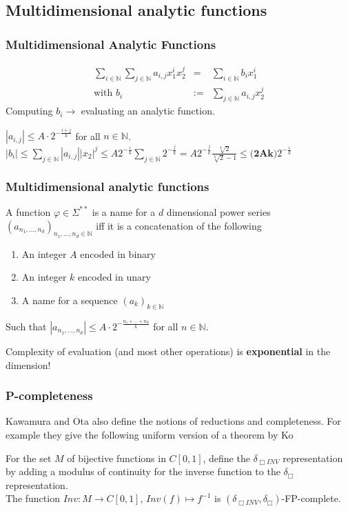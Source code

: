 \documentclass[xcolor=pdftex,dvipsnames,table]{beamer}
\newcommand{\N}{\ensuremath{\mathbb{N}}}
\newcommand{\sigmas}{\ensuremath{\Sigma^{**}}}
\newcommand{\abs}[1]{\left|#1\right|}
\begin{document}
\subsection{Multidimensional analytic functions}
\begin{frame}
  \frametitle{Multidimensional Analytic Functions}
  \begin{tcolorbox}[colback=yellow!5,title=Multidimensional Power Series,colframe=green!75!black]
    \begin{eqnarray*}
      \sum_{i \in \N} \sum_{j \in \N} a_{i,j} x_1^{i} x_2^{j} & = & \sum_{i \in \N} b_i x_1^{i} \\
      \text{with }
      b_i &:=& \sum_{j \in \N} a_{i,j}x_2^j
    \end{eqnarray*}
    Computing $b_i \rightarrow $ evaluating an analytic function.
\end{tcolorbox}
  \pause
  $\abs{a_{i,j}} \leq A \cdot 2^{-\frac{i+j}{k}}$ for all $n \in \N$. \\
  $\abs{b_i} \leq \sum_{j \in \N} \abs{a_{i,j}}\abs{x_2}^j \leq A2^{-\frac{i}{k}} \sum_{j \in \N} 2^{-\frac{j}{k}} = A2^{-\frac{j}{k}}\frac{\sqrt[k]{2}}{\sqrt[k]{2}-1} \leq \textbf{(2Ak)}2^{-\frac{i}{k}}   $
  \end{frame}
\begin{frame}
  \frametitle{Multidimensional analytic functions}
   \begin{tcolorbox}[colback=yellow!5,title=Representation,colframe=blue!75!black]
  A function $\varphi \in \sigmas$ is a name for a $d$ dimensional power series $(a_{n_1,\dots,n_d})_{n_1,\dots,n_d \in \N}$ iff it is a concatenation of the following
  \begin{enumerate}
  \item An integer $A$ encoded in binary
  \item An integer $k$ encoded in unary
  \item A name for a sequence $(a_k)_{k \in \N}$
  \end{enumerate}
  Such that $\abs{a_{n_1,\dots,n_d}} \leq A \cdot 2^{-\frac{n_1+\dots+n_d}{k}}$ for all $n \in \N$.
\end{tcolorbox}
   \pause
  \begin{tcolorbox}[colback=yellow!5,title=Note,colframe=red!75!black]
    Complexity of evaluation (and most other operations) is \textbf{exponential} in the dimension!
  \end{tcolorbox}
  \end{frame}
\begin{frame}
  \frametitle{P-completeness}
  Kawamura and Ota also define the notions of reductions and completeness.
  For example they give the following uniform version of a theorem by Ko
  \begin{theorem}
    For the set $M$ of bijective functions in $C[0,1]$, define the $\delta_{\Box INV}$ representation by adding a modulus of continuity for the inverse function to the $\delta_{\Box}$ representation.\\
    The function $Inv: M \to C[0,1],\, Inv(f) \mapsto f^{-1}$ is $(\delta_{\Box INV}, \delta_{\Box})$-FP-complete.
  \end{theorem}
\end{frame}
\end{document}
